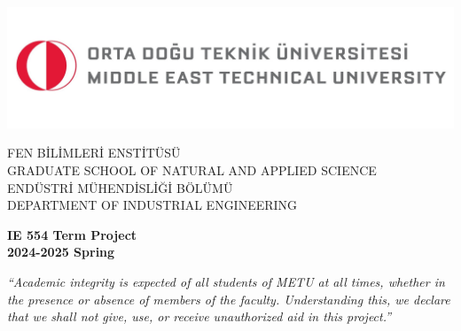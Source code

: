 
\begin{titlepage}
    \begin{center}
        \begin{minipage}{0.9\linewidth}
            \includegraphics[width=\linewidth]{cover-page/images/white_bg_tr_en.jpg}
            \hspace*{6.4em}
            \parbox[h]{0.7\textwidth}{
                \singlespacing
                \footnotesize\color{logogray}\ttfamily
                \vspace*{-1.6cm}
                FEN BİLİMLERİ ENSTİTÜSÜ\\
                GRADUATE SCHOOL OF NATURAL AND APPLIED SCIENCE\\
                ENDÜSTRİ MÜHENDİSLİĞİ BÖLÜMÜ\\
                DEPARTMENT OF INDUSTRIAL ENGINEERING}
        \end{minipage}
        \vspace{4cm}

        \huge{\textbf{IE 554 Term Project}}\\
        \LARGE{\textbf{2024-2025 Spring}}\\
        \vspace{3cm}

        \parbox{0.9\textwidth}{\normalsize\it
        “Academic integrity is expected of all students of METU at all times, whether in the presence or absence of members of the faculty. Understanding this, we declare that we shall not give, use, or receive unauthorized aid in this project.”
        }
        \vspace{1.5cm}


\end{center}
\end{titlepage}
